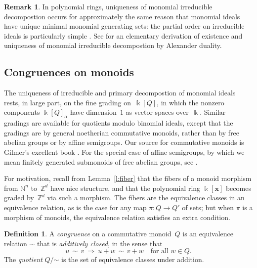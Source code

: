 \documentclass[12pt]{amsart}
\numberwithin{equation}{section}
\theoremstyle{definition}
\newtheorem{defn}[thm]{Definition}
\newtheorem{remark}[thm]{Remark}
\begin{document}
\begin{remark}
In polynomial rings, uniqueness of monomial irreducible decompostion
occurs for approximately the same reason that monomial ideals have
unique minimal monomial generating sets: the partial order on
irreducible ideals is particularly simple
\cite[Proposition~1.4]{rejecta}.  See \cite[\S5.2]{cca} for an
elementary derivation of existence and uniqueness of monomial
irreducible decompostion by Alexander duality.
\end{remark}

\subsection{Congruences on monoids}\label{s:cong}
The uniqueness of irreducible and primary decompostion of monomial
ideals rests, in large part, on the fine grading on~${\Bbbk}[Q]$, in which
the nonzero components ${\Bbbk}[Q]_\alpha$ have dimension~$1$ as vector
spaces over~${\Bbbk}$.  Similar gradings are available for quotients
modulo binomial ideals, except that the gradings are by general
noetherian commutative monoids, rather than by free abelian groups or
by affine semigroups.  Our source for commutative monoids is Gilmer's
excellent book \cite{gilmer}.  For the special case of affine
semigroups, by which we mean finitely generated submonoids of free
abelian groups, see \cite[Chapter~7]{cca}.

For motivation, recall from Lemma~\ref{l:fiber} that the fibers of a
monoid morphism from ${\mathbb{N}}^n$ to~${\mathbb{Z}}^d$ have nice structure, and that
the polynomial ring ${\Bbbk}[{\mathbf{x}}]$ becomes graded by~${\mathbb{Z}}^d$ via such a
morphism.  The fibers are the equivalence classes in an equivalence
relation, as is the case for any map $\pi: Q \to Q'$ of sets; but when
$\pi$ is a morphism of monoids, the equivalence relation satisfies an
extra condition.

\begin{defn}\label{d:congruence}
A \emph{congruence} on a commutative monoid~$Q$ is an equivalence
relation ${\mathord\sim}$ that is \emph{additively closed}, in the sense that
$$  u \,\sim\, v\ {\Rightarrow}\ u\!+\!w \,\sim\, v\!+\!w
  \quad\text{for all } w \in Q.
$$
The \emph{quotient} $Q/{\mathord\sim}$ is the set of equivalence classes
under addition.
\end{defn}
\end{document}

